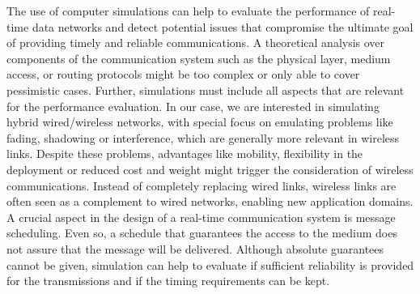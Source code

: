 \documentclass[conference]{IEEEtran}
\begin{document}

The use of computer simulations can help to evaluate the performance of real-time data networks and detect potential issues that compromise the ultimate goal of providing timely and reliable communications. A theoretical analysis over components of the communication system such as the physical layer, medium access, or routing protocols might be too complex or only able to cover pessimistic cases. Further, simulations must include all aspects that are relevant for the performance evaluation. In our case, we are interested in simulating hybrid wired/wireless networks, with special focus on emulating problems like fading, shadowing or interference, which are generally more relevant in wireless links. Despite these problems, advantages like mobility, flexibility in the deployment or reduced cost and weight might trigger the consideration of wireless communications. Instead of completely replacing wired links, wireless links are often seen as a complement to wired networks, enabling new application domains. A crucial aspect in the design of a real-time communication system is message scheduling. Even so, a schedule that guarantees the access to the medium does not assure that the message will be delivered. Although absolute guarantees cannot be given, simulation can help to evaluate if sufficient reliability is provided for the transmissions and if the timing requirements can be kept. 
\end{document}
